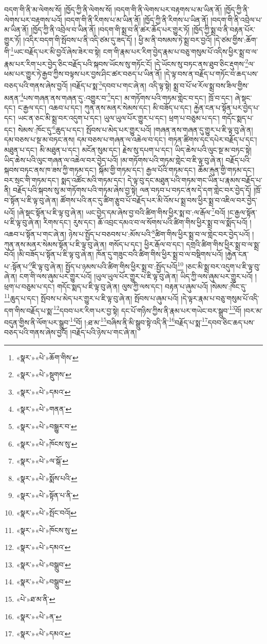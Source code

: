 བདག་གི་ནི་མ་ལེགས་སོ། །ཁྱོད་ཀྱི་ནི་ལེགས་སོ། །བདག་གི་ནི་ལེགས་པར་བརྟགས་པ་མ་ཡིན་ནོ། །ཁྱོད་ཀྱི་ནི་ལེགས་པར་བརྟགས་པའོ། །བདག་གི་ནི་རིགས་པ་མ་ཡིན་ནོ། །ཁྱོད་ཀྱི་ནི་རིགས་པ་ཡིན་ནོ། །བདག་གི་ནི་འབྲེལ་པ་མ་ཡིན་ནོ། །ཁྱོད་ཀྱི་ནི་འབྲེལ་བ་ཡིན་ནོ། །བདག་གི་སྨྲ་བ་ནི་ཚར་ཆོད་པར་གྱུར་ཏོ། །ཁྱོད་ཀྱི་སྨྲ་བ་ནི་བརྟན་པོར་གྱུར་ཏོ། །འདིར་བདག་གི་སྤོབས་པ་ནི་འདི་ཙམ་དུ་ཟད་དོ། །
ཕྱི་མ་ནི་བསམས་ཏེ་སྨྲ་བར་བྱའོ། །དེ་ཙམ་གྱིས་:ཆོག་གི་\footnote{«སྣར་»«པེ་»ཆོག་གིས་}ཡང་བརྗོད་པར་མི་བྱའོ་ཞེས་ཟེར་བ་སྟེ། ངག་གི་རྣམ་པར་རིག་བྱེད་རྣམ་པ་བཅུ་གསུམ་པོ་འདིས་ཕྱིར་སྨྲ་བ་ལ་རྣམ་པར་རིག་པར་བྱེད་ཅིང་བརྗོད་པའི་སྐབས་ཡོངས་སུ་གཏོང་ངོ། །དེ་ཡོངས་སུ་བཏང་ནས་ཐུབ་ཅིང་རྡུགས་\footnote{«སྣར་»«པེ་»སྡུགས་}ལ་ཕམ་པར་གྱུར་ཏེ་རྒྱབ་ཀྱིས་བལྟས་པར་བྱས་ཤིང་ཚར་བཅད་པ་ཡིན་ནོ། །དེ་ལྟ་བས་ན་བརྗོད་པ་གཏོང་བ་ཆད་པས་བཅད་པའི་གནས་ཞེས་བྱའོ། །བརྗོད་པ་སྨ་\footnote{«སྣར་»«པེ་»དམའ་}དབབ་པ་གང་ཞེ་ན། འདི་ལྟ་སྟེ། སྨྲ་བ་པོ་ཕ་རོལ་སྨྲ་བས་ཟིལ་གྱིས་མནན་\footnote{«སྣར་»«པེ་»གནན་}པས་གཞན་ནས་གཞན་དུ་:འགྱུར་བ་\footnote{«སྣར་»«པེ་»བསྒྱུར་བ་}དང་། མ་གཏོགས་པའི་གཏམ་གླེང་བ་དང་། ཁྲོ་བ་དང་། ཞེ་སྡང་དང་། ང་རྒྱལ་དང་། འཆབ་པ་དང་། ཀུན་ནས་མནར་སེམས་དང་། མི་བཟོད་པ་དང་། རྐྱེན་ངན་པ་སྟོན་པར་བྱེད་པ་དང་། ཡང་ན་ཅང་མི་སྨྲ་བར་འདུག་པ་དང་། ཡུལ་ཡུལ་པོར་གྱུར་པ་དང་། ཕྲག་པ་བཅུམ་པ་དང་། གདོང་སྨད་པ་དང་། སེམས་:ཁོང་དུ་\footnote{«སྣར་»«པེ་»ཁོངས་སུ་}ཆུད་པ་དང་། སྤོབས་པ་མེད་པར་གྱུར་པའོ། །གཞན་ནས་གཞན་དུ་གྱུར་པ་ཇི་ལྟ་བུ་ཞེ་ན། དམ་བཅས་པ་སྔ་མ་བཏང་ནས། དམ་བཅས་པ་གཞན་ལ་འཆེལ་བ་དང་། གཏན་ཚིགས་དང་དཔེར་བརྗོད་པ་དང་། མཐུན་པ་དང་། མི་མཐུན་པ་དང་། མངོན་སུམ་དང་། རྗེས་སུ་དཔག་པ་དང་། ཡིད་ཆེས་པའི་ལུང་སྔ་མ་བཏང་སྟེ། ཡིད་ཆེས་པའི་ལུང་གཞན་ལ་འཆེལ་བར་བྱེད་པའོ། །མ་གཏོགས་པའི་གཏམ་གླེང་བ་ཇི་ལྟ་བུ་ཞེ་ན། བརྗོད་པའི་སྐབས་བཏང་ནས་ཁ་ཟས་ཀྱི་གཏམ་དང་། སྐོམ་གྱི་གཏམ་དང་། རྒྱལ་པོའི་གཏམ་དང་། ཆོམ་རྐུན་གྱི་གཏམ་དང་། བར་སྲང་གི་གཏམ་དང་། སྨད་འཚོང་མའི་གཏམ་དང་། དེ་ལྟ་བུ་དང་མཐུན་པའི་གཏམ་གང་ཡིན་པ་རྣམས་བརྗོད་པ་ནི། བརྗོད་པའི་སྐབས་སུ་མ་གཏོགས་པའི་གཏམ་ཞེས་བྱ་སྟེ། ལན་བཏབ་པ་བཏང་ནས་དེ་དག་གླེང་བར་བྱེད་དོ། །ཁྲོ་བ་སྟོན་པ་ཇི་ལྟ་བུ་ཞེ་ན། ཚོགས་པའི་ནང་དུ་ཚིག་རྩུབ་པོ་བརྗོད་པར་མི་འོས་པ་སྨྲ་བས་ཕྱིར་སྨྲ་བ་འཇིལ་བར་བྱེད་པའོ། །ཞེ་སྡང་སྟོན་པ་ཇི་ལྟ་བུ་ཞེ་ན། ཡང་བྱེད་དམ་ཞེས་བྱ་བའི་ཚིག་གིས་ཕྱིར་སྨ་བ་:ལ་རྒོལ་\footnote{«སྣར་»«པེ་»ལ་སྒོ་}བའོ། །ང་རྒྱལ་སྟོན་པ་ཇི་ལྟ་བུ་ཞེ་ན། རིགས་དང་། རུས་དང་། ཆོ་འབྲང་དམའ་བ་ལ་སོགས་པའི་ཚིག་གིས་ཕྱིར་སྨྲ་བ་ལ་སྨོད་པའོ། །འཆབ་པ་སྟོན་པ་གང་ཞེ་ན། ཉེས་པ་སྤྱོད་པ་བཅབས་པ་:མོས་པའི་\footnote{«སྣར་»«པེ་»སྨོས་པའི་}ཚིག་གིས་ཕྱིར་སྨྲ་བ་ལ་གླེང་བར་བྱེད་པའོ། །ཀུན་ནས་མནར་སེམས་སྟོན་པ་ཇི་ལྟ་བུ་ཞེ་ན། གསོད་པ་དང་། ཕྱིར་རྒོལ་བ་དང་། དགྲའི་ཚིག་གིས་ཕྱིར་སྨྲ་བ་ལ་སྨྲ་བའོ། །མི་བཟོད་པ་སྟོན་པ་ཇི་ལྟ་བུ་ཞེ་ན། ཁོན་དུ་གཟུང་བའི་ཚིག་གིས་ཕྱིར་སྨྲ་བ་ལ་བསྡིགས་པའོ། །རྐྱེན་ངན་པ་:སྟོན་པ་\footnote{«སྣར་»«པེ་»སྟོན་པ་ནི་}ཇི་ལྟ་བུ་ཞེ་ན། སྤྱོད་པ་ཉམས་པའི་ཚིག་གིས་ཕྱིར་སྨྲ་བ་:སྤྱོད་པའོ།\footnote{«སྣར་»«པེ་»སྤོང་བའོ།} །ཅང་མི་སྨྲ་བར་འདུག་པ་ཇི་ལྟ་བུ་ཞེ་ན། ངག་གི་ལས་ཞུམ་པར་གྱུར་པའོ། །ཡུལ་ཡུལ་པོར་གྱུར་པ་ཇི་ལྟ་བུ་ཞེ་ན། ཡིད་ཀྱི་ལས་ཞུམ་པར་གྱུར་པའོ། །ཕྲག་པ་བཅུམ་པ་དང་། གདོང་སྨད་པ་ཇི་ལྟ་བུ་ཞེ་ན། ལུས་ཀྱི་ལས་དང་། བརྟན་པ་ཞུམ་པའོ། །སེམས་:ཁོང་དུ་\footnote{«སྣར་»«པེ་»ཁོངས་སུ་}ཆུད་པ་དང་། སྤོབས་པ་མེད་པར་གྱུར་པ་ཇི་ལྟ་བུ་ཞེ་ན། སྤོབས་པ་ཞུམ་པའོ། །དེ་ལྟར་རྣམ་པ་བཅུ་གསུམ་པོ་འདི་དག་གིས་བརྗོད་པ་སྨ་\footnote{«སྣར་»«པེ་»དམའ་}དབབ་པར་རིག་པར་བྱ་སྟེ། དང་པོ་གཉིས་ཀྱིས་ནི་རྣམ་པར་གཡེང་བར་སྒྲུབ་\footnote{«སྣར་»«པེ་»བསྒྲུབ་}བོ། །བར་མ་བདུན་གྱིས་ནི་ལོག་པར་སྒྲུབ་\footnote{«སྣར་»«པེ་»བསྒྲུབ་}བོ། །:ཐ་མ་\footnote{«པེ་»ཐ་མ་ནི་}བཞིས་ནི་མི་སྒྲུབ་སྟེ་འདི་ནི་\footnote{«སྣར་»«པེ་»ན་}བརྗོད་པ་སྨ་\footnote{«སྣར་»«པེ་»དམའ་}དབབ་ཅིང་ཆད་པས་བཅད་པའི་གནས་ཞེས་བྱའོ། །བརྗོད་པའི་ཉེས་པ་གང་ཞེ་ན། 